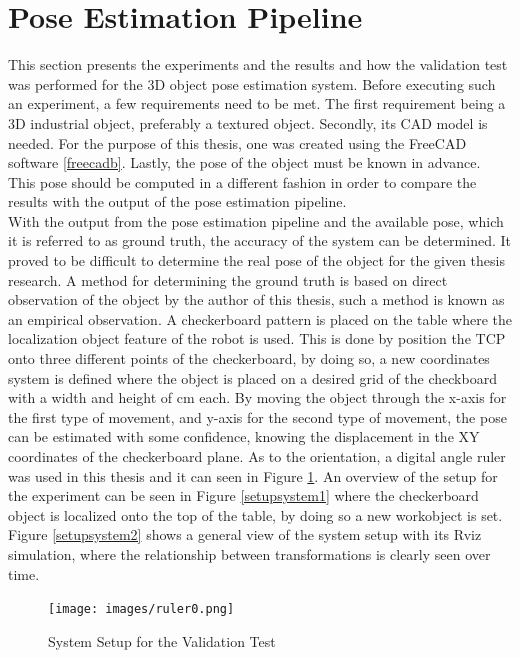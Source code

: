 
\section{Pose Estimation Pipeline}

This section presents the experiments and the results and how the validation test was performed for the 3D object pose estimation system. Before executing such an experiment, a few requirements need to be met. The first requirement being a 3D industrial object, preferably a textured object. Secondly, its CAD model is needed. For the purpose of this thesis, one was created using the FreeCAD software \ref{freecadb}. Lastly, the pose of the object must be known in advance. This pose should be computed in a different fashion in order to compare the results with the output of the pose estimation pipeline.\\
With the output from the pose estimation pipeline and the available pose, which it is referred to as ground truth, the accuracy of the system can be determined. It proved to be difficult to determine the real pose of the object for the given thesis research. A method for determining the ground truth is based on direct observation of the object by the author of this thesis, such a method is known as an empirical observation. A checkerboard pattern is placed on the table where the localization object feature of the robot is used. This is done by position the TCP onto three different points of the checkerboard, by doing so, a new coordinates system is defined where the object is placed on a desired grid of the checkboard with a width and height of \unit[2]{cm} each. By moving the object through the x-axis for the first type of movement, and y-axis for the second type of movement, the pose can be estimated with some confidence, knowing the displacement in the XY coordinates of  the checkerboard plane. As to the orientation, a digital angle ruler was used in this thesis and it can seen in Figure \ref{fig:ruler}. An overview of the setup for the experiment can be seen in Figure \ref{setupsystem1} where the checkerboard object is localized onto the top of the table, by doing so a new workobject is set. Figure \ref{setupsystem2} shows a general view of the system setup with  its Rviz simulation, where the relationship between transformations is clearly seen over time. 

\begin{figure}[!h]
\begin{center}
\texttt{[image: images/ruler0.png]}
\caption{System Setup for the Validation Test }
\label{fig:ruler}
\end{center}
\end{figure}



